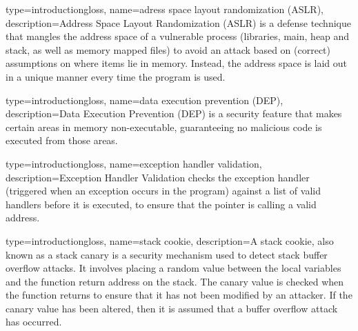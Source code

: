 {
    type=introductiongloss,
    name={adress space layout randomization (ASLR)},
    description={Address Space Layout Randomization (ASLR) is a defense technique that mangles the address space of a vulnerable process (libraries, main, heap and stack, as well as memory mapped files) to avoid an attack based on (correct) assumptions on where items lie in memory. Instead, the address space is laid out in a unique manner every time the program is used.}
}



{
    type=introductiongloss,
    name={data execution prevention (DEP)},
    description={Data Execution Prevention (DEP) is a security feature that makes certain areas in memory non-executable, guaranteeing no malicious code is executed from those areas.
    }
}

{
    type=introductiongloss,
    name={exception handler validation},
    description={Exception Handler Validation checks the exception handler (triggered when an exception occurs in the program) against a list of valid handlers before it is executed, to ensure that the pointer is calling a valid address. 
    }
}




{
    type=introductiongloss,
    name={stack cookie},
    description={A stack cookie, also known as a stack canary is a security mechanism used to detect stack buffer overflow attacks. It involves placing a random value between the local variables and the function return address on the stack. The canary value is checked when the function returns to ensure that it has not been modified by an attacker. If the canary value has been altered, then it is assumed that a buffer overflow attack has occurred. 
    }
}



















